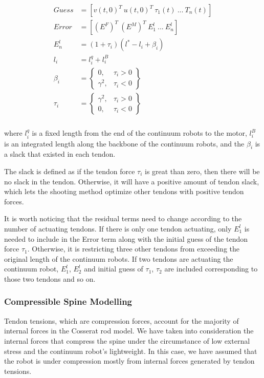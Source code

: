 \begin{align}
    \begin{split}
        Guess &= [v(t,0)^T \ u(t,0)^T \ \tau_1(t) \ ... \ T_n(t)]\\
        Error &= [(E^F)^T \ (E^M)^T \ E^l_1 \ ... \ E^l_n]\\
        E^l_n &= (1+\tau_i)(l^*-l_i+\beta_i)\\
        l_i &= l^q_i+l^B_i\\
        \beta_i &= \begin{Bmatrix}
        0, & \tau_i > 0\\ 
        \gamma^2,  & \tau_i < 0
        \end{Bmatrix}\\
        \tau_i &= \begin{Bmatrix}
        \gamma^2, & \tau_i > 0\\ 
        0,  & \tau_i < 0
        \end{Bmatrix}\\
     \end{split}
     \label{eq:X5}
\end{align}

where $l^q_i$ is a fixed length from the end of the continuum robots to the motor, $l^B_i$ is an integrated length along the backbone of the continuum robots, and the $\beta_i$ is a slack that existed in each tendon. 

The slack is defined as if the tendon force $\tau_i$ is great than zero, then there will be no slack in the tendon. Otherwise, it will have a positive amount of tendon slack, which lets the shooting method optimize other tendons with positive tendon forces.

It is worth noticing that the residual terms need to change according to the number of actuating tendons. If there is only one tendon actuating, only $E^{l}_{1}$ is needed to include in the Error term along with the initial guess of the tendon force $\tau_1$.
Otherwise, it is restricting three other tendons from exceeding the original length of the continuum robots. If two tendons are actuating the continuum robot, $E^l_{1}$, $E^l_{2}$ and initial guess of $\tau_1$, $\tau_2$ are included corresponding to those two tendons and so on.


\subsubsection{Compressible Spine Modelling}

Tendon tensions, which are compression forces, account for the majority of internal forces in the Cosserat rod model. We have taken into consideration the internal forces that compress the spine under the circumstance of low external stress and the continuum robot's lightweight. In this case, we have assumed that the robot is under compression mostly from internal forces generated by tendon tensions. 

